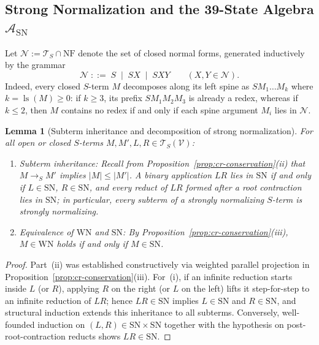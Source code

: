 \documentclass[11pt,reqno]{amsart}
\numberwithin{equation}{section}
\theoremstyle{plain}
\newtheorem{lemma}[theorem]{Lemma}
\theoremstyle{definition}
\theoremstyle{remark}
\DeclareMathOperator{\ls}{ls}
\newcommand{\TS}{\mathcal{T}_S}
\newcommand{\TSV}{\mathcal{T}_S(\mathcal{V})}
\newcommand{\NF}{\mathrm{NF}}
\newcommand{\SN}{\mathrm{SN}}
\newcommand{\WN}{\mathrm{WN}}
\newcommand{\redS}{\to_S}
\begin{document}
\subsection{Strong Normalization and the 39-State Algebra \texorpdfstring{$\mathcal{A}_{\SN}$}{A\_SN}}\label{subsec:sn-algebra}

Let $\mathcal{N} := \TS \cap \NF$ denote the set of closed normal forms, generated inductively by the grammar
\begin{equation}\label{eq:cnf-grammar}
\mathcal{N} \;::=\; S \;\mid\; S X \;\mid\; S X Y
\qquad (X, Y \in \mathcal{N}).
\end{equation}
Indeed, every closed $S$-term $M$ decomposes along its left spine as $S M_1 \dots M_k$ where $k = \ls(M) \ge 0$: if $k \ge 3$, its prefix $S M_1 M_2 M_3$ is already a redex, whereas if $k \le 2$, then $M$ contains no redex if and only if each spine argument $M_i$ lies in $\mathcal{N}$.

\begin{lemma}[Subterm inheritance and decomposition of strong normalization]\label{lem:wn-eq-sn}
For all open or closed $S$-terms $M, M', L, R \in \TSV$:
\begin{enumerate}[label=(\roman*),leftmargin=2.2em]
  \item \emph{Subterm inheritance:} Recall from Proposition~\ref{prop:cr-conservation}(ii) that $M \redS M'$ implies $|M| \le |M'|$. A binary application $L R$ lies in $\SN$ if and only if $L \in \SN$, $R \in \SN$, and every reduct of $L R$ formed after a root contraction lies in $\SN$; in particular, every subterm of a strongly normalizing $S$-term is strongly normalizing.
  \item \emph{Equivalence of $\WN$ and $\SN$:} By Proposition~\ref{prop:cr-conservation}(iii), $M \in \WN$ holds if and only if $M \in \SN$.
\end{enumerate}
\end{lemma}

\begin{proof}
Part~(ii) was established constructively via weighted parallel projection in Proposition~\ref{prop:cr-conservation}(iii). For~(i), if an infinite reduction starts inside $L$ (or $R$), applying $R$ on the right (or $L$ on the left) lifts it step-for-step to an infinite reduction of $L R$; hence $L R \in \SN$ implies $L \in \SN$ and $R \in \SN$, and structural induction extends this inheritance to all subterms. Conversely, well-founded induction on $(L, R) \in \SN \times \SN$ together with the hypothesis on post-root-contraction reducts shows $L R \in \SN$.
\end{proof}
\end{document}
